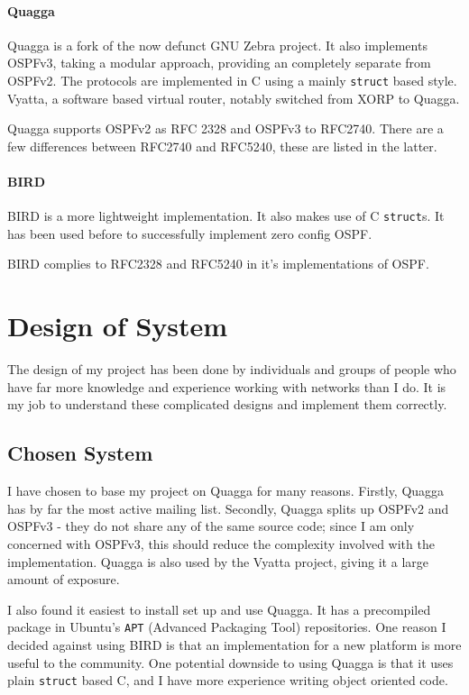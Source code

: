 \documentclass[12pt]{report}
\begin{document}
\subsubsection{Quagga}
Quagga is a fork of the now defunct GNU Zebra project. It also implements
OSPFv3, taking a modular approach, providing an completely separate from OSPFv2.
The protocols are implemented in C using a mainly \texttt{struct} based style.
Vyatta, a software based virtual router, notably switched from XORP to Quagga. 

Quagga supports OSPFv2 as RFC 2328 and OSPFv3 to RFC2740. There are a few
differences between RFC2740 and RFC5240, these are listed in the latter.

\subsubsection{BIRD}
BIRD is a more lightweight implementation. It also makes use of C
\texttt{struct}s. It has been used before to successfully implement zero config
OSPF. 

BIRD complies to RFC2328 and RFC5240 in it's implementations of OSPF. 

\chapter{Design of System}
The design of my project has been done by individuals and groups of
people who have far more knowledge and experience working with networks than I
do. It is my job to understand these complicated designs and implement them
correctly.

\section{Chosen System}
I have chosen to base my project on Quagga for many reasons. Firstly, Quagga has
by far the most active mailing list. Secondly, Quagga splits up OSPFv2 and
OSPFv3 - they do not share any of the same source code; since I am only
concerned with OSPFv3, this should reduce the complexity involved with the
implementation. Quagga is also used by the Vyatta project, giving it a large
amount of exposure. 

I also found it easiest to install set up and use Quagga. It has a precompiled
package in Ubuntu's \texttt{APT} (Advanced Packaging Tool) repositories. One
reason I decided against using BIRD is that an implementation for a new platform
is more useful to the community. One potential downside to using Quagga is that
it uses plain \texttt{struct} based C, and I have more experience writing object
oriented code. 
\end{document}
